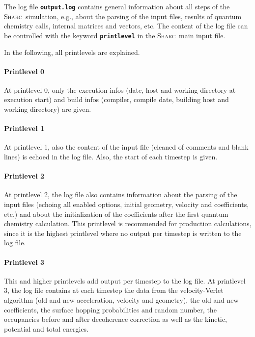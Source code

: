 \documentclass[a4paper,11pt,DIV=15,openany,twoside=false]{scrbook}
\newcommand{\sharc}{\textsc{Sharc}}
\newcommand{\ttt}[1]{\textbf{\texttt{#1}}}
\begin{document}
The log file \ttt{output.log} contains general information about all steps of the \sharc\ simulation, e.g., about the parsing of the input files, results of quantum chemistry calls, internal matrices and vectors, etc. The content of the log file can be controlled with the keyword \ttt{printlevel} in the \sharc\ main input file.

In the following, all printlevels are explained.

\paragraph{Printlevel 0}

At printlevel 0, only the execution infos (date, host and working directory at execution start) and build infos (compiler, compile date, building host and working directory) are given.

\paragraph{Printlevel 1}

At printlevel 1, also the content of the input file (cleaned of comments and blank lines) is echoed in the log file. Also, the start of each timestep is given.

\paragraph{Printlevel 2}

At printlevel 2, the log file also contains information about the parsing of the input files (echoing all enabled options, initial geometry, velocity and coefficients, etc.) and about the initialization of the coefficients after the first quantum chemistry calculation. This printlevel is recommended for production calculations, since it is the highest printlevel where no output per timestep is written to the log file.

\paragraph{Printlevel 3}

This and higher printlevels add output per timestep to the log file. At printlevel 3, the log file contains at each timestep the data from the velocity-Verlet algorithm (old and new acceleration, velocity and geometry), the old and new coefficients, the surface hopping probabilities and random number, the occupancies before and after decoherence correction as well as the kinetic, potential and total energies.
\end{document}
